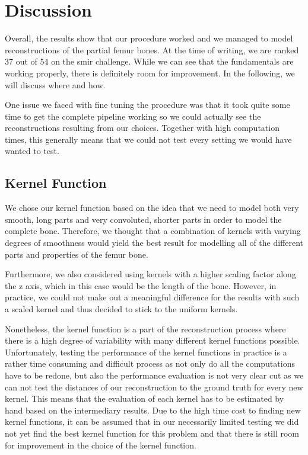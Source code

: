 \section{Discussion}
\label{sec:discussion}
Overall, the results show that our procedure worked and we managed to model reconstructions of the partial femur bones. At the time of writing, we are ranked 37 out of 54 on the smir challenge. While we can see that the fundamentals are working properly, there is definitely room for improvement. In the following, we will discuss where and how.

One issue we faced with fine tuning the procedure was that it took quite some time to get the complete pipeline working so we could actually see the reconstructions resulting from our choices. Together with high computation times, this generally means that we could not test every setting we would have wanted to test.
		

\subsection{Kernel Function}
\label{subsec:kernfuncdisc}
We chose our kernel function based on the idea that we need to model both very smooth, long parts and very convoluted, shorter parts in order to model the complete bone. Therefore, we thought that a combination of kernels with varying degrees of smoothness would yield the best result for modelling all of the different parts and properties of the femur bone. 

Furthermore, we also considered using kernels with a higher scaling factor along the z axis, which in this case would be the length of the bone. However, in practice, we could not make out a meaningful difference for the results with such a scaled kernel and thus decided to stick to the uniform kernels.

Nonetheless, the kernel function is a part of the reconstruction process where there is a high degree of variability with many different kernel functions possible. Unfortunately, testing the performance of the kernel functions in practice is a rather time consuming and difficult process as not only do all the computations have to be redone, but also the performance evaluation is not very clear cut as we can not test the distances of our reconstruction to the ground truth for every new kernel. This means that the evaluation of each kernel has to be estimated by hand based on the intermediary results. Due to the high time cost to finding new kernel functions, it can be assumed that in our necessarily limited testing we did not yet find the best kernel function for this problem and that there is still room for improvement in the choice of the kernel function.

